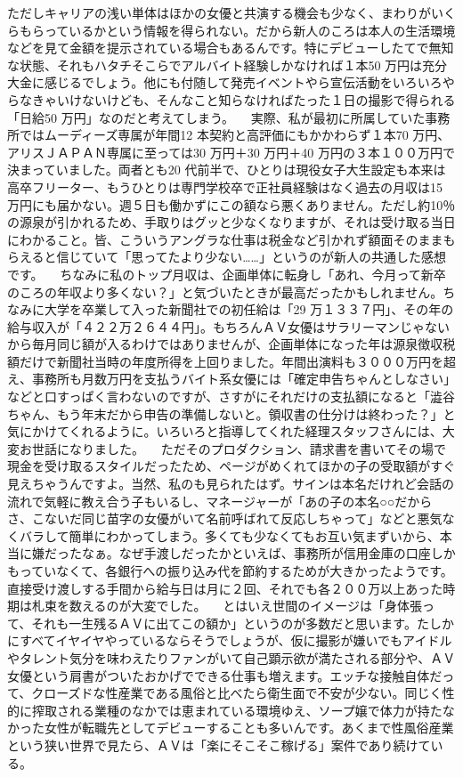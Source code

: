 \documentclass[12pt,UTF8]{ctexbook}
\begin{document}
ただしキャリアの浅い単体はほかの女優と共演する機会も少なく、まわりがいくらもらっているかという情報を得られない。だから新人のころは本人の生活環境などを見て金額を提示されている場合もあるんです。特にデビューしたてで無知な状態、それもハタチそこらでアルバイト経験しかなければ１本50
 万円は充分大金に感じるでしょう。他にも付随して発売イベントやら宣伝活動をいろいろやらなきゃいけないけども、そんなこと知らなければたった１日の撮影で得られる「日給50
 万円」なのだと考えてしまう。
　実際、私が最初に所属していた事務所ではムーディーズ専属が年間12
 本契約と高評価にもかかわらず１本70
 万円、アリスＪＡＰＡＮ専属に至っては30
 万円＋30
 万円＋40
 万円の３本１００万円で決まっていました。両者とも20
 代前半で、ひとりは現役女子大生設定も本来は高卒フリーター、もうひとりは専門学校卒で正社員経験はなく過去の月収は15
 万円にも届かない。週５日も働かずにこの額なら悪くありません。ただし約10％
 の源泉が引かれるため、手取りはグッと少なくなりますが、それは受け取る当日にわかること。皆、こういうアングラな仕事は税金など引かれず額面そのままもらえると信じていて「思ってたより少ない……」というのが新人の共通した感想です。
　ちなみに私のトップ月収は、企画単体に転身し「あれ、今月って新卒のころの年収より多くない？」と気づいたときが最高だったかもしれません。ちなみに大学を卒業して入った新聞社での初任給は「29
 万１３３７円」、その年の給与収入が「４２２万２６４４円」。もちろんＡＶ女優はサラリーマンじゃないから毎月同じ額が入るわけではありませんが、企画単体になった年は源泉徴収税額だけで新聞社当時の年度所得を上回りました。年間出演料も３０００万円を超え、事務所も月数万円を支払うバイト系女優には「確定申告ちゃんとしなさい」などと口すっぱく言わないのですが、さすがにそれだけの支払額になると「澁谷ちゃん、もう年末だから申告の準備しないと。領収書の仕分けは終わった？」と気にかけてくれるように。いろいろと指導してくれた経理スタッフさんには、大変お世話になりました。
　ただそのプロダクション、請求書を書いてその場で現金を受け取るスタイルだったため、ページがめくれてほかの子の受取額がすぐ見えちゃうんですよ。当然、私のも見られたはず。サインは本名だけれど会話の流れで気軽に教え合う子もいるし、マネージャーが「あの子の本名○○だからさ、こないだ同じ苗字の女優がいて名前呼ばれて反応しちゃって」などと悪気なくバラして簡単にわかってしまう。多くても少なくてもお互い気まずいから、本当に嫌だったなぁ。なぜ手渡しだったかといえば、事務所が信用金庫の口座しかもっていなくて、各銀行への振り込み代を節約するためが大きかったようです。直接受け渡しする手間から給与日は月に２回、それでも各２００万以上あった時期は札束を数えるのが大変でした。
　とはいえ世間のイメージは「身体張って、それも一生残るＡＶに出てこの額か」というのが多数だと思います。たしかにすべてイヤイヤやっているならそうでしょうが、仮に撮影が嫌いでもアイドルやタレント気分を味わえたりファンがいて自己顕示欲が満たされる部分や、ＡＶ女優という肩書がついたおかげでできる仕事も増えます。エッチな接触自体だって、クローズドな性産業である風俗と比べたら衛生面で不安が少ない。同じく性的に搾取される業種のなかでは恵まれている環境ゆえ、ソープ嬢で体力が持たなかった女性が転職先としてデビューすることも多いんです。あくまで性風俗産業という狭い世界で見たら、ＡＶは「楽にそこそこ稼げる」案件であり続けている。
\end{document}
